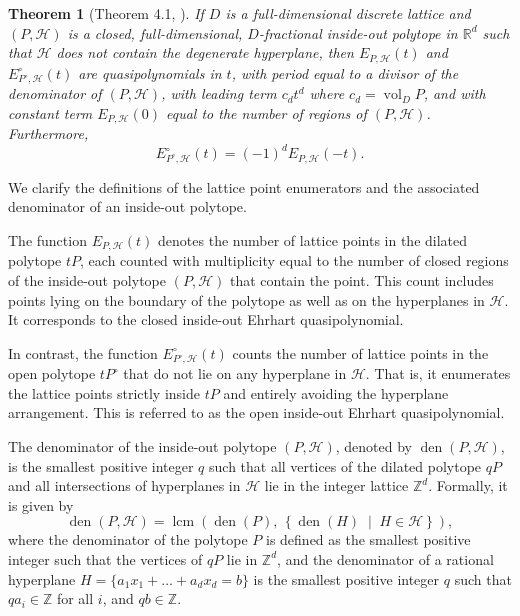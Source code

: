 \documentclass{birkjour}
\newtheorem{theorem}{Theorem}[section]
\theoremstyle{definition}
\theoremstyle{remark}
\numberwithin{equation}{section}
\begin{document}
\begin{theorem}[Theorem 4.1, \cite{BZ}]
\label{TBZ}
If \( D \) is a full-dimensional discrete lattice and \( (P, \mathcal{H}) \) is a closed, full-dimensional, \( D \)-fractional inside-out polytope in \( \mathbb{R}^d \) such that \( \mathcal{H} \) does not contain the degenerate hyperplane, then \( E_{P, \mathcal{H}}(t) \) and \( E^{\circ}_{P^{\circ}, \mathcal{H}}(t) \) are quasipolynomials in \( t \), with period equal to a divisor of the denominator of \( (P, \mathcal{H}) \), with leading term \( c_d t^d \) where \( c_d = \operatorname{vol}_D P \), and with constant term \( E_{P, \mathcal{H}}(0) \) equal to the number of regions of \( (P, \mathcal{H}) \). Furthermore,
\[
E^{\circ}_{P^{\circ}, \mathcal{H}}(t) = (-1)^d E_{P, \mathcal{H}}(-t).
\]
\end{theorem}


We clarify the definitions of the lattice point enumerators and the associated denominator of an inside-out polytope.

The function \( E_{P, \mathcal{H}}(t) \) denotes the number of lattice points in the dilated polytope \( tP \), each counted with multiplicity equal to the number of closed regions of the inside-out polytope \( (P, \mathcal{H}) \) that contain the point. This count includes points lying on the boundary of the polytope as well as on the hyperplanes in \( \mathcal{H} \). It corresponds to the closed inside-out Ehrhart quasipolynomial.

In contrast, the function \( E^{\circ}_{P^{\circ}, \mathcal{H}}(t) \) counts the number of lattice points in the open polytope \( tP^{\circ} \) that do not lie on any hyperplane in \( \mathcal{H} \). That is, it enumerates the lattice points strictly inside \( tP \) and entirely avoiding the hyperplane arrangement. This is referred to as the open inside-out Ehrhart quasipolynomial.

The denominator of the inside-out polytope \( (P, \mathcal{H}) \), denoted by \( \operatorname{den}(P, \mathcal{H}) \), is the smallest positive integer \( q \) such that all vertices of the dilated polytope \( qP \) and all intersections of hyperplanes in \( \mathcal{H} \) lie in the integer lattice \( \mathbb{Z}^d \). Formally, it is given by
\[
\operatorname{den}(P, \mathcal{H}) = \operatorname{lcm} \left( \operatorname{den}(P), \, \left\{ \operatorname{den}(H) \;\middle|\; H \in \mathcal{H} \right\} \right),
\]
where the denominator of the polytope \( P \) is defined as the smallest positive integer such that the vertices of \( qP \) lie in \( \mathbb{Z}^d \), and the denominator of a rational hyperplane \( H = \{ a_1x_1 + \dots + a_d x_d = b \} \) is the smallest positive integer \( q \) such that \( q a_i \in \mathbb{Z} \) for all \( i \), and \( q b \in \mathbb{Z} \).
\end{document}

